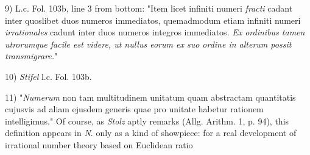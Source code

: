 \vfill
\leftline{\rule{2in}{0.4pt}}
\vspace{0.2cm}
{
\footnotesize
9) L.c. Fol. 103b, line 3 from bottom: "Item licet infiniti numeri \textit{fracti} cadant inter quoslibet duos numeros immediatos, quemadmodum etiam infiniti numeri \textit{irrationales} cadunt inter duos numeros integros immediatos. \textit{Ex ordinibus tamen utrorumque facile est videre, ut nullus eorum ex suo ordine in alterum possit transmigrare.}"

10) \textit{Stifel} l.c. Fol. 103b.

11) "\textit{Numerum} non tam multitudinem unitatum quam abstractam quantitatis cujusvis ad aliam ejusdem generis quae pro unitate habetur rationem intelligimus." Of course, as \textit{Stolz} aptly remarks (Allg. Arithm. 1, p. 94), this definition appears in \textit{N}. only as a kind of showpiece: for a real development of irrational number theory based on Euclidean ratio

}
